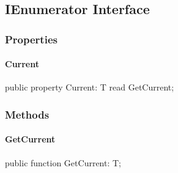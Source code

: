 \documentclass{report}
\begin{document}
\subsection*{IEnumerator Interface}
\subsubsection*{\large{\textbf{Properties}}\normalsize\hspace{1ex}\hfill}
\paragraph*{Current}\hspace*{\fill}

\begin{list}{}{
\setlength{\itemindent}{0cm}
\setlength{\listparindent}{0cm}
\setlength{\leftmargin}{\evensidemargin}
\addtolength{\leftmargin}{\tmplength}
\settowidth{\labelsep}{X}
\addtolength{\leftmargin}{\labelsep}
\setlength{\labelwidth}{\tmplength}
}
\begin{flushleft}
\item[\textbf{Declaration}\hfill]
\begin{ttfamily}
public property Current: T read GetCurrent;\end{ttfamily}


\end{flushleft}
\end{list}
\subsubsection*{\large{\textbf{Methods}}\normalsize\hspace{1ex}\hfill}
\paragraph*{GetCurrent}\hspace*{\fill}

\begin{list}{}{
\setlength{\itemindent}{0cm}
\setlength{\listparindent}{0cm}
\setlength{\leftmargin}{\evensidemargin}
\addtolength{\leftmargin}{\tmplength}
\settowidth{\labelsep}{X}
\addtolength{\leftmargin}{\labelsep}
\setlength{\labelwidth}{\tmplength}
}
\begin{flushleft}
\item[\textbf{Declaration}\hfill]
\begin{ttfamily}
public function GetCurrent: T;\end{ttfamily}


\end{flushleft}
\end{list}
\end{document}
